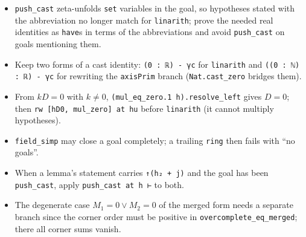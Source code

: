 \documentclass[11pt]{article}
\begin{document}
\begin{itemize}
\item \texttt{push\_cast} zeta-unfolds \texttt{set} variables in the goal, so hypotheses stated with
the abbreviation no longer match for \texttt{linarith}; prove the needed real identities as
\texttt{have}s in terms of the abbreviations and avoid \texttt{push\_cast} on goals mentioning them.
\item Keep two forms of a cast identity: \texttt{(0 : ℝ) - γc} for \texttt{linarith} and
\texttt{((0 : ℕ) : ℝ) - γc} for rewriting the \texttt{axisPrim} branch (\texttt{Nat.cast\_zero}
bridges them).
\item From $kD=0$ with $k\ne0$, \texttt{(mul\_eq\_zero.1 h).resolve\_left} gives $D=0$; then
\texttt{rw [hD0, mul\_zero] at hu} before \texttt{linarith} (it cannot multiply hypotheses).
\item \texttt{field\_simp} may close a goal completely; a trailing \texttt{ring} then fails with
``no goals''.
\item When a lemma's statement carries \texttt{↑(h₂ + j)} and the goal has been \texttt{push\_cast},
apply \texttt{push\_cast at h ⊢} to both.
\item The degenerate case $M_1=0\lor M_2=0$ of the merged form needs a separate branch since the
corner order must be positive in \texttt{overcomplete\_eq\_merged}; there all corner sums vanish.
\end{itemize}
\end{document}
